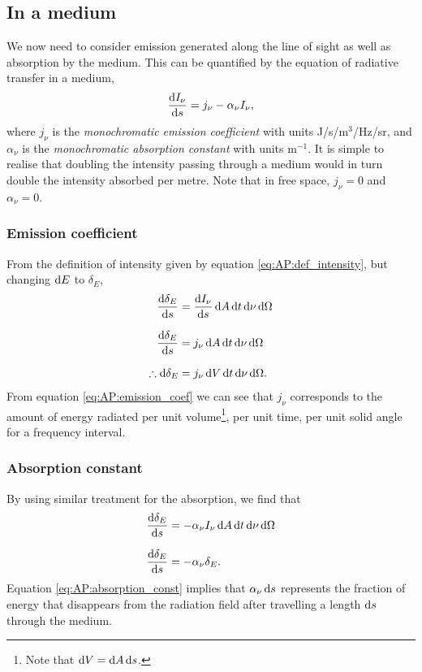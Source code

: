 \subsection{In a medium}
We now need  to consider emission generated along the line of sight as well as absorption by the medium.
 This can be quantified by the equation of radiative transfer in a medium,
%
\begin{equation}
	\frac{\mathop{}\!\mathrm{d} I_\nu}{\mathop{}\!\mathrm{d} s} = j_\nu - \alpha_\nu I_\nu,
	\label{eq:AP:radiative_transfer}
\end{equation}
%
where $j_\nu$ is the \emph{monochromatic emission coefficient} with units J/s/m$^3$/Hz/sr, and $\alpha_\nu$ is the \emph{monochromatic absorption constant} with units m$^{-1}$.
 It is simple to realise that doubling the intensity passing through a medium would in turn double the intensity absorbed per metre.
 Note that in free space, $j_\nu = 0$ and $\alpha_\nu = 0$.
\par
\subsubsection{Emission coefficient}
From the definition of intensity given by equation \ref{eq:AP:def_intensity}, but changing $\mathop{}\!\mathrm{d} E$ to $\delta_E$,
%
\begin{align}
	\frac{\diff \delta_E}{\diff s} &= \frac{\diff I_\nu}{\diff s} \diff A \diff t \diff \nu \diff \Omega
	\linedrop
	\frac{\diff \delta_E}{\diff s} &= j_\nu \diff A \diff t \diff \nu \diff \Omega
	\linedrop
	\therefore \diff \delta_E &= j_\nu \diff V \diff t \diff \nu \diff \Omega.
	\label{eq:AP:emission_coef}
\end{align}
%
From equation \ref{eq:AP:emission_coef} we can see that $j_\nu$ corresponds to the amount of energy radiated per unit volume\footnote{Note that $\mathop{}\!\mathrm{d} V = \mathop{}\!\mathrm{d} A \mathop{}\!\mathrm{d} s$.}, per unit time, per unit solid angle for a frequency interval.
\par 
\subsubsection{Absorption constant}
By using similar treatment for the absorption, we find that
%
\begin{align}
		\frac{\diff \delta_E}{\diff s} &= -\alpha_\nu I_\nu  \diff A \diff t \diff \nu \diff \Omega
		\linedrop
		\frac{\diff \delta_E}{\diff s} &= -\alpha_\nu \delta_E.
		\label{eq:AP:absorption_const}
\end{align}
%
Equation \ref{eq:AP:absorption_const} implies that $\alpha_\nu \mathop{}\!\mathrm{d} s$ represents the fraction of energy that disappears from the radiation field after travelling a length $\mathop{}\!\mathrm{d} s$ through the medium.
\par  
